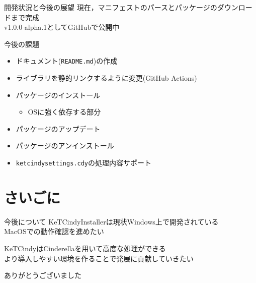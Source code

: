 \documentclass[
    t,
    allowframebreaks,
    aspectratio=32,
    unicode
]{beamer}
\newcommand{\lf}{\vspace{\baselineskip}}
\begin{document}
    \begin{frame}[fragile]{\secname}{開発状況と今後の展望}
        現在，マニフェストのパースとパッケージのダウンロードまで完成\\
        v1.0.0-alpha.1としてGitHubで公開中\pause

        \lf
        今後の課題
        \begin{itemize}
            \item ドキュメント(\verb|README.md|)の作成
            \item ライブラリを静的リンクするように変更(GitHub Actions)
            \item パッケージのインストール
                \begin{itemize}
                    \item OSに強く依存する部分
                \end{itemize}
            \item パッケージのアップデート
            \item パッケージのアンインストール
            \item \verb|ketcindysettings.cdy|の処理内容サポート
        \end{itemize}
    \end{frame}

    \section{さいごに}
    \begin{frame}{\secname}{今後について}
        KeTCindyInstallerは現状Windows上で開発されている\\
        MacOSでの動作確認を進めたい\pause

        \lf
        KeTCindyはCinderellaを用いて高度な処理ができる\\
        より導入しやすい環境を作ることで発展に貢献していきたい
    \end{frame}

    \begin{frame}[standout]
        ありがとうございました
    \end{frame}
\end{document}
